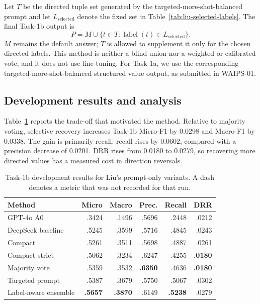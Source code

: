 \documentclass[sigconf,article,a4paper]{acmart}
\begin{document}
Let $T$ be the directed tuple set generated by the
targeted-more-shot-balanced prompt and let $L_{\mathrm{selected}}$ denote the
fixed set in Table~\ref{tab:liu-selected-labels}. The final Task-1b output is
\begin{equation}
 P=M\cup\{t\in T:\operatorname{label}(t)\in L_{\mathrm{selected}}\}.
 \label{eq:liu-selective}
\end{equation}
$M$ remains the default answer; $T$ is allowed to supplement it
only for the chosen directed labels. This method is neither a blind union nor
a weighted or calibrated vote, and it does not use fine-tuning. For Task 1a,
we use the corresponding targeted-more-shot-balanced structured value output,
as submitted in WAIPS-01.

\subsection{Development results and analysis}

Table~\ref{tab:liu-dev} reports the trade-off that motivated the method.
Relative to majority voting, selective recovery increases Task-1b Micro-F1 by
0.0298 and Macro-F1 by 0.0338. The gain is primarily recall: recall rises by
0.0602, compared with a precision decrease of 0.0201. DRR rises from 0.0180 to
0.0279, so recovering more directed values has a measured cost in direction
reversals.

\begin{table}[t]
  \caption{Task-1b development results for Liu's prompt-only variants. A dash
  denotes a metric that was not recorded for that run.}
  \label{tab:liu-dev}
  \centering
  \scriptsize
  \begin{tabular}{@{}lrrrrr@{}}
    \toprule
    Method & Micro & Macro & Prec. & Recall & DRR \\
    \midrule
    GPT-4o A0 & .3424 & .1496 & .5696 & .2448 & .0212 \\
    DeepSeek baseline & .5245 & .3599 & .5716 & .4845 & .0243 \\
    Compact & .5261 & .3511 & .5698 & .4887 & .0261 \\
    Compact-strict & .5062 & .3234 & .6247 & .4255 & \textbf{.0180} \\
    Majority vote & .5359 & .3532 & \textbf{.6350} & .4636 & \textbf{.0180} \\
    Targeted prompt & .5387 & .3679 & .5750 & .5067 & .0302 \\
    Label-aware ensemble & \textbf{.5657} & \textbf{.3870} & .6149 & \textbf{.5238} & .0279 \\
    \bottomrule
  \end{tabular}
\end{table}
\end{document}
